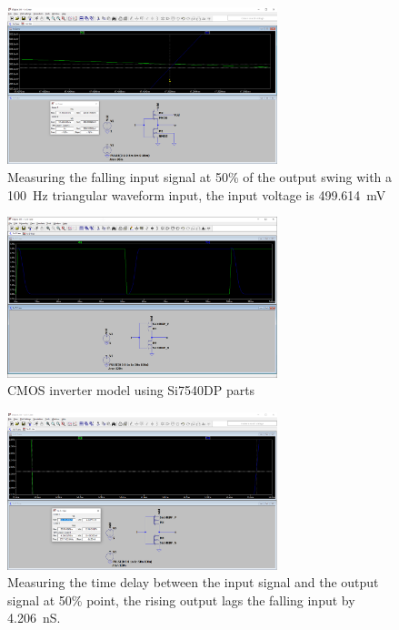 \documentclass{article}
\begin{document}
	\begin{figure}[H]
	    \centering
	    \includegraphics[width=0.7\textwidth]{1a-2-3-sim}
	    \caption[Measuring the falling input signal]{Measuring the falling input signal at 50\% of the output swing with a \SI{100}{Hz} triangular waveform input, the input voltage is \SI{499.614}{mV}}
	\end{figure}
	
	\begin{figure}[H]
	    \centering
	    \includegraphics[width=0.7\textwidth]{1a-3-1-sim}
	    \caption{CMOS inverter model using Si7540DP parts}
	\end{figure}
	
	\begin{figure}[H]
	    \centering
	    \includegraphics[width=0.7\textwidth]{1a-3-2-sim}
	    \caption[Measuring the rising output time delay]{Measuring the time delay between the input signal and the output signal at 50\% point, the rising output lags the falling input by \SI{4.206}{nS}.}
	\end{figure}
	
\end{document}
